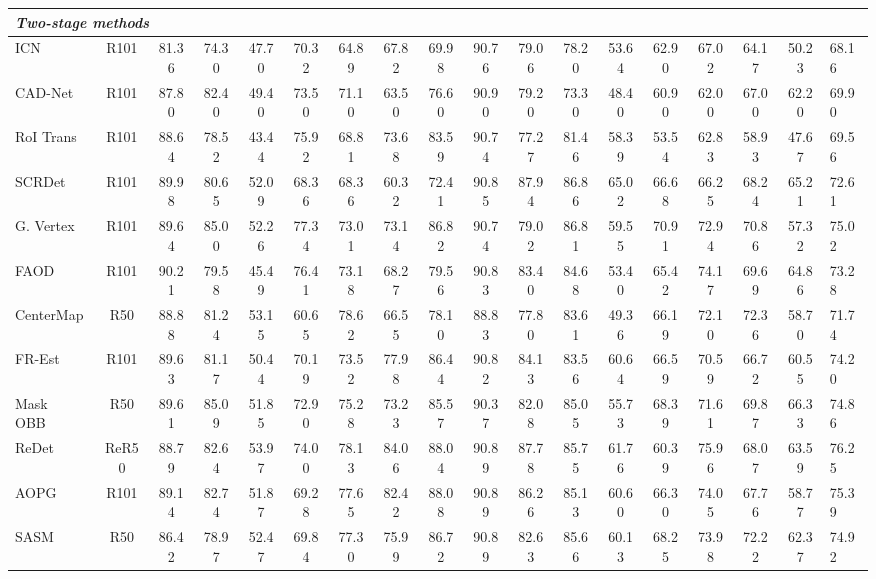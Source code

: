 \begin{table*}[ht]
\begin{center}
{\begin{tabular}{l|c|c c c c c c c c c c c c c c c|l}
    \multicolumn{18}{l}{{\bf \emph{Two-stage methods}}} \\
    \midrule
		ICN~\cite{azimi2018towards} & R101 & 81.36 & 74.30 & 47.70 & 70.32 & 64.89 & 67.82 & 69.98 & 90.76 & 79.06 & 78.20 & 53.64 & 62.90 & 67.02 & 64.17 & 50.23 &  68.16 \\
		CAD-Net~\cite{zhang2019cad} & R101 & 87.80 & 82.40 & 49.40 & 73.50 & 71.10 & 63.50 & 76.60 & 90.90 & 79.20 & 73.30 & 48.40 & 60.90 & 62.00 & 67.00 & 62.20 &  69.90 \\
		RoI Trans~\cite{ding2019learning} & R101 & 88.64 & 78.52 & 43.44 & 75.92 & 68.81 & 73.68 & 83.59 & 90.74 & 77.27 & 81.46 & 58.39 & 53.54 & 62.83 & 58.93 & 47.67 &  69.56 \\
		SCRDet~\cite{yang2019scrdet} & R101 & 89.98 & 80.65 & 52.09 & 68.36 & 68.36 & 60.32 & 72.41 & 90.85 & 87.94 & 86.86 & 65.02 & 66.68 & 66.25 & 68.24 & 65.21 &  72.61 \\
		G. Vertex~\cite{xu2020gliding} & R101 & 89.64 & 85.00 & 52.26 & 77.34 & 73.01 & 73.14 & 86.82 & 90.74 & 79.02 & 86.81 & 59.55 & 70.91 & 72.94 & 70.86 & 57.32 &  75.02 \\
		FAOD~\cite{li2019feature} & R101 & 90.21 & 79.58 & 45.49 & 76.41 & 73.18 & 68.27 & 79.56 & 90.83 & 83.40 & 84.68 & 53.40 & 65.42 & 74.17 & 69.69 & 64.86 &  73.28 \\
		CenterMap~\cite{wang2020learning} & R50  & 88.88 & 81.24 & 53.15 & 60.65 & 78.62 & 66.55 & 78.10 & 88.83 & 77.80 & 83.61 & 49.36 & 66.19 & 72.10 & 72.36 & 58.70 &  71.74 \\
		FR-Est~\cite{fu2020point} & R101 & 89.63 & 81.17 & 50.44 & 70.19 & 73.52 & 77.98 & 86.44 & 90.82 & 84.13 & 83.56 & 60.64 & 66.59 & 70.59 & 66.72 & 60.55 &  74.20 \\
		Mask OBB~\cite{wang2019mask} & R50  & 89.61 & 85.09 & 51.85 & 72.90 & 75.28 & 73.23 & 85.57 & 90.37 & 82.08 & 85.05 & 55.73 & 68.39 & 71.61 & 69.87 & 66.33 &  74.86 \\
		ReDet~\cite{han2021redet} & ReR50 & 88.79 & 82.64 & 53.97 & 74.00 & 78.13 & 84.06 & 88.04 & 90.89 & 87.78 & 85.75 & 61.76 & 60.39 & 75.96 & 68.07 & 63.59 &  76.25 \\
		AOPG~\cite{cheng2022anchor} & R101  & 89.14 & 82.74 & 51.87 & 69.28 & 77.65 & 82.42 & 88.08 & 90.89 & 86.26 & 85.13 & 60.60 & 66.30  & 74.05 & 67.76 & 58.77 &  75.39 \\
		SASM~\cite{hou2022shape} & R50  & 86.42 & 78.97 & 52.47 & 69.84 & 77.30 & 75.99 & 86.72 & 90.89 & 82.63 & 85.66 & 60.13 & 68.25 & 73.98 & 72.22 & 62.37 &  74.92 \\
		

\end{tabular}}
\end{center}
\end{table*}
